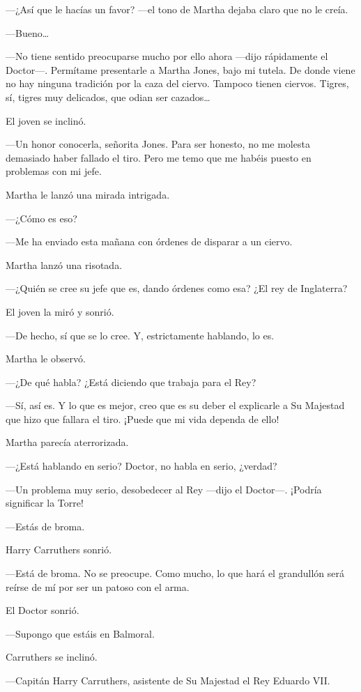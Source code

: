 ---¿Así que le hacías un favor? ---el tono de Martha dejaba claro que no
le creía.

---Bueno\ldots{}

---No tiene sentido preocuparse mucho por ello ahora ---dijo rápidamente
el Doctor---. Permítame presentarle a Martha Jones, bajo mi tutela. De
donde viene no hay ninguna tradición por la caza del ciervo. Tampoco
tienen ciervos. Tigres, sí, tigres muy delicados, que odian ser
cazados\ldots{}

El joven se inclinó.

---Un honor conocerla, señorita Jones. Para ser honesto, no me molesta
demasiado haber fallado el tiro. Pero me temo que me habéis puesto en
problemas con mi jefe.

Martha le lanzó una mirada intrigada.

---¿Cómo es eso?

---Me ha enviado esta mañana con órdenes de disparar a un ciervo.

Martha lanzó una risotada.

---¿Quién se cree su jefe que es, dando órdenes como esa? ¿El rey de
Inglaterra?

El joven la miró y sonrió.

---De hecho, sí que se lo cree. Y, estrictamente hablando, lo es.

Martha le observó.

---¿De qué habla? ¿Está diciendo que trabaja para el Rey?

---Sí, así es. Y lo que es mejor, creo que es su deber el explicarle a
Su Majestad que hizo que fallara el tiro. ¡Puede que mi vida dependa de
ello!

Martha parecía aterrorizada.

---¿Está hablando en serio? Doctor, no habla en serio, ¿verdad?

---Un problema muy serio, desobedecer al Rey ---dijo el Doctor---.
¡Podría significar la Torre!

---Estás de broma.

Harry Carruthers sonrió.

---Está de broma. No se preocupe. Como mucho, lo que hará el grandullón
será reírse de mí por ser un patoso con el arma.

El Doctor sonrió.

---Supongo que estáis en Balmoral.

Carruthers se inclinó.

---Capitán Harry Carruthers, asistente de Su Majestad el Rey Eduardo
VII.

